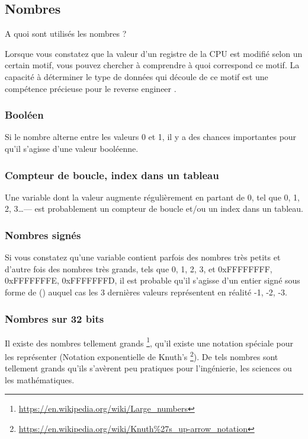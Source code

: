 \subsection{Nombres}

A quoi sont utilisés les nombres ?

Lorsque vous constatez que la valeur d'un registre de la CPU est modifié selon un certain motif, vous pouvez
chercher à comprendre à quoi correspond ce motif.
La capacité à déterminer le type de données qui découle de ce motif est une compétence précieuse pour le reverse engineer .

\subsubsection{Booléen}

Si le nombre alterne entre les valeurs 0 et 1, il y a des chances importantes pour qu'il s'agisse d'une valeur booléenne.

\subsubsection{Compteur de boucle, index dans un tableau}

Une variable dont la valeur augmente régulièrement en partant de 0, tel que 0, 1, 2, 3\dots--- est probablement un
compteur de boucle et/ou un index dans un tableau.

\subsubsection{Nombres signés}

Si vous constatez qu'une variable contient parfois des nombres très petits et d'autre fois des nombres très grands,
tels que 0, 1, 2, 3, et 0xFFFFFFFF, 0xFFFFFFFE, 0xFFFFFFFD, il est probable qu'il s'agisse d'un entier signé sous
forme de  () auquel cas les 3 dernières valeurs représentent en réalité
-1, -2, -3.

\subsubsection{Nombres sur 32 bits}

Il existe des nombres tellement grands \footnote{\url{https://en.wikipedia.org/wiki/Large_numbers}},
qu'il existe une notation spéciale pour les représenter (Notation exponentielle de Knuth's
\footnote{\url{https://en.wikipedia.org/wiki/Knuth\%27s_up-arrow_notation}}).
De tels nombres sont tellement grands qu'ils s'avèrent peu pratiques pour l'ingénierie, les sciences
ou les mathématiques.

